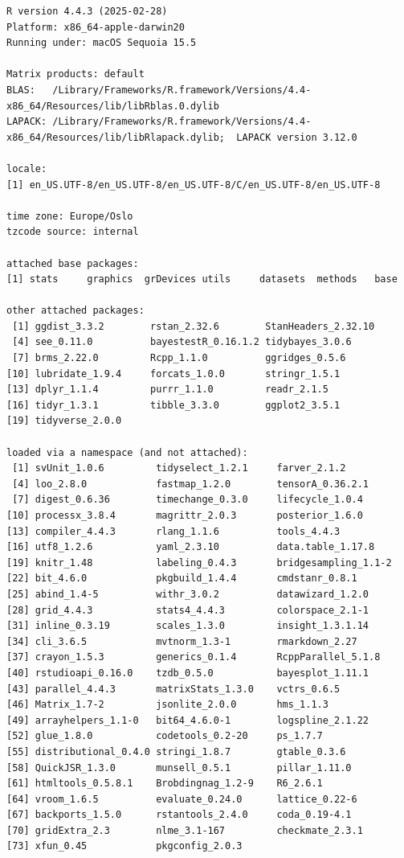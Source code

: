 \documentclass[
  doc,
  floatsintext,
  longtable,
  nolmodern,
  notxfonts,
  notimes,
  colorlinks=true,linkcolor=blue,citecolor=blue,urlcolor=blue]{apa7}
\begin{document}
\begin{verbatim}
R version 4.4.3 (2025-02-28)
Platform: x86_64-apple-darwin20
Running under: macOS Sequoia 15.5

Matrix products: default
BLAS:   /Library/Frameworks/R.framework/Versions/4.4-x86_64/Resources/lib/libRblas.0.dylib 
LAPACK: /Library/Frameworks/R.framework/Versions/4.4-x86_64/Resources/lib/libRlapack.dylib;  LAPACK version 3.12.0

locale:
[1] en_US.UTF-8/en_US.UTF-8/en_US.UTF-8/C/en_US.UTF-8/en_US.UTF-8

time zone: Europe/Oslo
tzcode source: internal

attached base packages:
[1] stats     graphics  grDevices utils     datasets  methods   base     

other attached packages:
 [1] ggdist_3.3.2        rstan_2.32.6        StanHeaders_2.32.10
 [4] see_0.11.0          bayestestR_0.16.1.2 tidybayes_3.0.6    
 [7] brms_2.22.0         Rcpp_1.1.0          ggridges_0.5.6     
[10] lubridate_1.9.4     forcats_1.0.0       stringr_1.5.1      
[13] dplyr_1.1.4         purrr_1.1.0         readr_2.1.5        
[16] tidyr_1.3.1         tibble_3.3.0        ggplot2_3.5.1      
[19] tidyverse_2.0.0    

loaded via a namespace (and not attached):
 [1] svUnit_1.0.6         tidyselect_1.2.1     farver_2.1.2        
 [4] loo_2.8.0            fastmap_1.2.0        tensorA_0.36.2.1    
 [7] digest_0.6.36        timechange_0.3.0     lifecycle_1.0.4     
[10] processx_3.8.4       magrittr_2.0.3       posterior_1.6.0     
[13] compiler_4.4.3       rlang_1.1.6          tools_4.4.3         
[16] utf8_1.2.6           yaml_2.3.10          data.table_1.17.8   
[19] knitr_1.48           labeling_0.4.3       bridgesampling_1.1-2
[22] bit_4.6.0            pkgbuild_1.4.4       cmdstanr_0.8.1      
[25] abind_1.4-5          withr_3.0.2          datawizard_1.2.0    
[28] grid_4.4.3           stats4_4.4.3         colorspace_2.1-1    
[31] inline_0.3.19        scales_1.3.0         insight_1.3.1.14    
[34] cli_3.6.5            mvtnorm_1.3-1        rmarkdown_2.27      
[37] crayon_1.5.3         generics_0.1.4       RcppParallel_5.1.8  
[40] rstudioapi_0.16.0    tzdb_0.5.0           bayesplot_1.11.1    
[43] parallel_4.4.3       matrixStats_1.3.0    vctrs_0.6.5         
[46] Matrix_1.7-2         jsonlite_2.0.0       hms_1.1.3           
[49] arrayhelpers_1.1-0   bit64_4.6.0-1        logspline_2.1.22    
[52] glue_1.8.0           codetools_0.2-20     ps_1.7.7            
[55] distributional_0.4.0 stringi_1.8.7        gtable_0.3.6        
[58] QuickJSR_1.3.0       munsell_0.5.1        pillar_1.11.0       
[61] htmltools_0.5.8.1    Brobdingnag_1.2-9    R6_2.6.1            
[64] vroom_1.6.5          evaluate_0.24.0      lattice_0.22-6      
[67] backports_1.5.0      rstantools_2.4.0     coda_0.19-4.1       
[70] gridExtra_2.3        nlme_3.1-167         checkmate_2.3.1     
[73] xfun_0.45            pkgconfig_2.0.3     
\end{verbatim}
\end{document}
